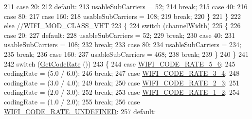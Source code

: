 \begin{DoxyCode}
211             \textcolor{keywordflow}{case} 20:
212             \textcolor{keywordflow}{default}:
213               usableSubCarriers = 52;
214               \textcolor{keywordflow}{break};
215             \textcolor{keywordflow}{case} 40:
216             \textcolor{keywordflow}{case} 80:
217             \textcolor{keywordflow}{case} 160:
218               usableSubCarriers = 108;
219               \textcolor{keywordflow}{break};
220             \}
221         \}
222       \textcolor{keywordflow}{else} \textcolor{comment}{//WIFI\_MOD\_CLASS\_VHT}
223         \{
224           \textcolor{keywordflow}{switch} (channelWidth)
225             \{
226             \textcolor{keywordflow}{case} 20:
227             \textcolor{keywordflow}{default}:
228               usableSubCarriers = 52;
229               \textcolor{keywordflow}{break};
230             \textcolor{keywordflow}{case} 40:
231               usableSubCarriers = 108;
232               \textcolor{keywordflow}{break};
233             \textcolor{keywordflow}{case} 80:
234               usableSubCarriers = 234;
235               \textcolor{keywordflow}{break};
236             \textcolor{keywordflow}{case} 160:
237               usableSubCarriers = 468;
238               \textcolor{keywordflow}{break};
239             \}
240         \}
241 
242       \textcolor{keywordflow}{switch} (\hyperlink{classns3_1_1WifiMode_a41fcb1abd2aa488145f2f43ca9ba8e1d}{GetCodeRate} ())
243         \{
244         \textcolor{keywordflow}{case} \hyperlink{namespacens3_aeaf3a86fd4bdb7829955238fba43e2adaf0309d61b4cf97e5718f6d3b9fdba3aa}{WIFI\_CODE\_RATE\_5\_6}:
245           codingRate = (5.0 / 6.0);
246           \textcolor{keywordflow}{break};
247         \textcolor{keywordflow}{case} \hyperlink{namespacens3_aeaf3a86fd4bdb7829955238fba43e2ada705b2eb134214c4f87c2b07dfb59046a}{WIFI\_CODE\_RATE\_3\_4}:
248           codingRate = (3.0 / 4.0);
249           \textcolor{keywordflow}{break};
250         \textcolor{keywordflow}{case} \hyperlink{namespacens3_aeaf3a86fd4bdb7829955238fba43e2ada161e88df840a9d1ed66f6f8edd0d6415}{WIFI\_CODE\_RATE\_2\_3}:
251           codingRate = (2.0 / 3.0);
252           \textcolor{keywordflow}{break};
253         \textcolor{keywordflow}{case} \hyperlink{namespacens3_aeaf3a86fd4bdb7829955238fba43e2ada66dfa017f6a74bcb72cdccfee778e90b}{WIFI\_CODE\_RATE\_1\_2}:
254           codingRate = (1.0 / 2.0);
255           \textcolor{keywordflow}{break};
256         \textcolor{keywordflow}{case} \hyperlink{namespacens3_aeaf3a86fd4bdb7829955238fba43e2adab3a130183c58362e3825366228ebf7ba}{WIFI\_CODE\_RATE\_UNDEFINED}:
257         \textcolor{keywordflow}{default}:

\end{DoxyCode}
